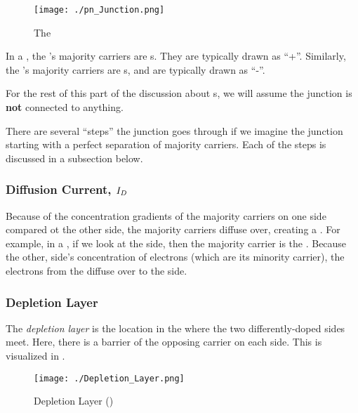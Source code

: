 \begin{figure}[h!tbp]
  \centering
  \texttt{[image: ./pn\_Junction.png]}
  \caption{The \PNJunction{} \parencite[p.~149]{sedraTextbook7}}
  \label{fig:The_pn_Junction}
\end{figure}

In a \PNJunction{}, the \PType{}'s majority carriers are s.
They are typically drawn as ``+''.
Similarly, the \NType{}'s majority carriers are s, and are typically drawn as ``-''.

\begin{blackbox}
  For the rest of this part of the discussion about \PNJunction{}s, we will assume the junction is \textbf{not} connected to anything.
\end{blackbox}

There are several ``steps'' the junction goes through if we imagine the junction starting with a perfect separation of majority carriers.
Each of the steps is discussed in a subsection below.

\subsubsection{Diffusion Current, $I_{D}$}\label{subsubsec:pn_Junction-Diffusion_Current-No_V}
Because of the concentration gradients of the majority carriers on one side compared ot the other side, the majority carriers diffuse over, creating a .
For example, in a \PNJunction{}, if we look at the \NType{} side, then the majority carrier is the .
Because the other, \PType{} side's concentration of electrons (which are its minority carrier), the electrons from the \NType{} diffuse over to the \PType{} side.

\subsubsection{Depletion Layer}\label{subsubsec:Depletion_Layer}
\begin{definition}\label{def:Depletion_Layer}
  The \emph{depletion layer} is the location in the \PNJunction{} where the two differently-doped sides meet.
  Here, there is a barrier of the opposing carrier on each side.
  This is visualized in .
\end{definition}

\begin{figure}[h!tbp]
  \centering
  \texttt{[image: ./Depletion\_Layer.png]}
  \caption{Depletion Layer (\cite[p.~150]{sedraTextbook7})}
  \label{fig:Depletion_Layer}
\end{figure}

